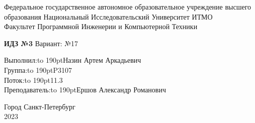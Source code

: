 \newpage
\begin{titlepage}
    \fontsize{12pt}{14.4pt}
    \selectfont
    \begin{center}
        Федеральное государственное автономное
        образовательное учреждение высшего образования
        Национальный Исследовательский Университет ИТМО \\
        Факультет Программной Инженерии и Компьютерной Техники
    \end{center}

    \vspace{11em}

    \begin{center}
        \large{\textbf{ИДЗ №3} \linebreak
        Вариант: №17 \linebreak}
    \end{center}

    \vspace{18em}




    \hfill\parbox{10cm}{
        Выполнил:\hfill\hbox to 190pt{Назин Артем Аркадьевич\hfill}\\
        Группа:\hfill\hbox to 190pt{P3107\hfill}\\
        Поток:\hfill\hbox to 190pt{11.3\hfill}\\
        Преподаватель:\hfill\hbox to 190pt{Ершов Александр Романович\hfill}
    }


    \vspace{\fill}

    \begin{center}
        Город Санкт-Петербург \\2023
    \end{center}
    
\end{titlepage}